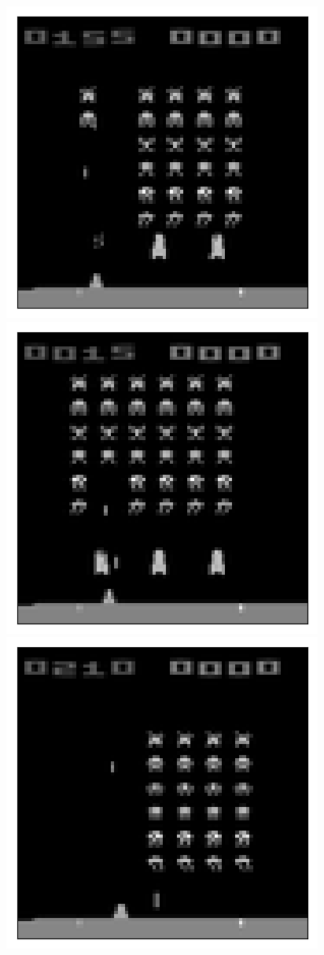 \begin{figure}[h!]
\centering
\captionsetup{justification=centering}
\begin{multicols}{4}
    \includegraphics[scale=0.4]{figures/results/latent_image/beta_1_sample_10_original.png}
    \includegraphics[scale=0.4]{figures/results/latent_image/beta_1_sample_30_original.png}
    \includegraphics[scale=0.4]{figures/results/latent_image/beta_1_sample_70_original.png}

\end{multicols}
\end{figure}
